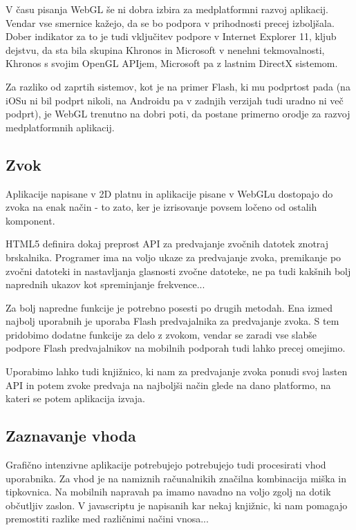 V času pisanja WebGL še ni dobra izbira za medplatformni razvoj aplikacij. Vendar vse smernice kažejo, da se bo podpora v prihodnosti precej izboljšala. Dober indikator za to je tudi vključitev podpore v Internet Explorer 11, kljub dejstvu, da sta bila skupina Khronos in Microsoft v nenehni tekmovalnosti, Khronos s svojim OpenGL APIjem, Microsoft pa z lastnim DirectX sistemom.

Za razliko od zaprtih sistemov, kot je na primer Flash, ki mu podprtost pada (na iOSu ni bil podprt nikoli, na Androidu pa v zadnjih verzijah tudi uradno ni več podprt), je WebGL trenutno na dobri poti, da postane primerno orodje za razvoj medplatformnih aplikacij.

\subsection{Zvok}

Aplikacije napisane v 2D platnu in aplikacije pisane v WebGLu dostopajo do zvoka na enak način - to zato, ker je izrisovanje povsem ločeno od ostalih komponent.

HTML5 definira dokaj preprost API za predvajanje zvočnih datotek znotraj brskalnika. Programer ima na voljo ukaze za predvajanje zvoka, premikanje po zvočni datoteki in nastavljanja glasnosti zvočne datoteke, ne pa tudi kakšnih bolj naprednih ukazov kot spreminjanje frekvence...

Za bolj napredne funkcije je potrebno posesti po drugih metodah. Ena izmed najbolj uporabnih je uporaba Flash predvajalnika za predvajanje zvoka. S tem pridobimo dodatne funkcije za delo z zvokom, vendar se zaradi vse slabše podpore Flash predvajalnikov na mobilnih podporah tudi lahko precej omejimo. 

Uporabimo lahko tudi knjižnico, ki nam za predvajanje zvoka ponudi svoj lasten API in potem zvoke predvaja na najboljši način glede na dano platformo, na kateri se potem aplikacija izvaja.

\subsection{Zaznavanje vhoda}

Grafično intenzivne aplikacije potrebujejo potrebujejo tudi procesirati vhod uporabnika. Za vhod je na namiznih računalnikih značilna kombinacija miška in tipkovnica. Na mobilnih napravah pa imamo navadno na voljo zgolj na dotik občutljiv zaslon. V javascriptu je napisanih kar nekaj knjižnic, ki nam pomagajo premostiti razlike med različnimi načini vnosa...

